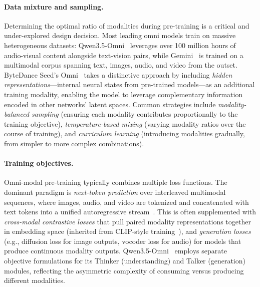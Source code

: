 \documentclass{article}
\begin{document}
\paragraph{Data mixture and sampling.}
Determining the optimal ratio of modalities during pre-training is a critical and under-explored design decision.
Most leading omni models train on massive heterogeneous datasets: Qwen3.5-Omni~\cite{qwen2026omni} leverages over 100 million hours of audio-visual content alongside text-vision pairs, while Gemini~\cite{google2024gemini} is trained on a multimodal corpus spanning text, images, audio, and video from the outset.
ByteDance Seed's Omni~\cite{seed2026omni} takes a distinctive approach by including \emph{hidden representations}---internal neural states from pre-trained models---as an additional training modality, enabling the model to leverage complementary information encoded in other networks' latent spaces.
Common strategies include \emph{modality-balanced sampling} (ensuring each modality contributes proportionally to the training objective), \emph{temperature-based mixing} (varying modality ratios over the course of training), and \emph{curriculum learning} (introducing modalities gradually, from simpler to more complex combinations).

\paragraph{Training objectives.}
Omni-modal pre-training typically combines multiple loss functions.
The dominant paradigm is \emph{next-token prediction} over interleaved multimodal sequences, where images, audio, and video are tokenized and concatenated with text tokens into a unified autoregressive stream~\cite{jiang2024chameleon,google2024gemini}.
This is often supplemented with \emph{cross-modal contrastive losses} that pull paired modality representations together in embedding space (inherited from CLIP-style training~\cite{radford2021clip}), and \emph{generation losses} (e.g., diffusion loss for image outputs, vocoder loss for audio) for models that produce continuous modality outputs.
Qwen3.5-Omni~\cite{qwen2026omni} employs separate objective formulations for its Thinker (understanding) and Talker (generation) modules, reflecting the asymmetric complexity of consuming versus producing different modalities.
\end{document}

